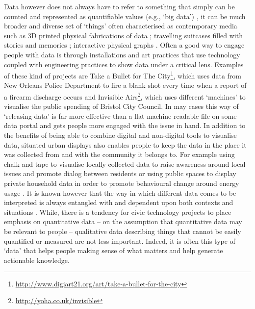 Data however does not always have to refer to something that simply can be counted and represented as quantifiable values (e.g., `big data') \citep{michael_toward_2016,mcmillan_data_2016}, it can be much broader and diverse set of `things' often characterised as contemporary media such as 3D printed physical fabrications of data \citep{nissen_data-things:_2015}; travelling suitcases filled with stories and memories \citep{crivellaro_re-making_2016}; interactive physical graphs \citep{sweeney_pixel_2019}. Often a good way to engage people with data is through installations and art practices that use technology coupled with engineering practices to show data under a critical lens. Examples of these kind of projects are Take a Bullet for The City\footnote{\url{http://www.digiart21.org/art/take-a-bullet-for-the-city}}, which uses data from New Orleans Police Department to fire a blank shot every time when a report of a firearm discharge occurs and Invisible Airs\footnote{\url{http://yoha.co.uk/invisible}}, which uses different `machines' to visualise the public spending of Bristol City Council. In may cases this way of `releasing data' is far more effective than a flat machine readable file on some data portal and gets people more engaged with the issue in hand. In addition to the benefits of being able to combine digital and non-digital tools to visualise data, situated urban displays also enables people to keep the data in the place it was collected from and with the community it belongs to. For example using chalk and tape to visualise locally collected data to raise awareness around local issues and promote dialog between residents \citep{koeman_what_2014} or using public spaces to display private household data in order to promote behavioural change around energy usage \citep{moere_comparative_2011,bird_pulse_2010}. It is known however that the way in which different data comes to be interpreted is always entangled with and dependent upon both contexts and situations \citep{suchman_plans_1985,taylor_data--place:_2015}. While, there is a tendency for civic technology projects to place emphasis on quantitative data -- on the assumption that quantitative data may be relevant to people -- qualitative data describing things that cannot be easily quantified or measured are not less important. Indeed, it is often this type of `data' that helps people making sense of what matters and help generate actionable knowledge.

